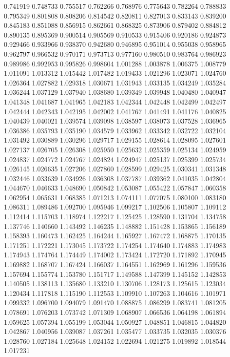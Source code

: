 0.741919
0.748733
0.755517
0.762266
0.768976
0.775643
0.782264
0.788833
0.795349
0.801808
0.808206
0.814542
0.820811
0.827013
0.833143
0.839200
0.845183
0.851088
0.856915
0.862661
0.868325
0.873906
0.879402
0.884812
0.890135
0.895369
0.900514
0.905569
0.910533
0.915406
0.920186
0.924873
0.929466
0.933966
0.938370
0.942680
0.946895
0.951014
0.955038
0.958965
0.962797
0.966532
0.970171
0.973713
0.977160
0.980510
0.983764
0.986923
0.989986
0.992953
0.995826
0.998604
1.001288
1.003878
1.006375
1.008779
1.011091
1.013312
1.015442
1.017482
1.019433
1.021296
1.023071
1.024760
1.026364
1.027882
1.029318
1.030671
1.031943
1.033135
1.034249
1.035284
1.036244
1.037129
1.037940
1.038680
1.039349
1.039948
1.040480
1.040947
1.041348
1.041687
1.041965
1.042183
1.042344
1.042448
1.042499
1.042497
1.042444
1.042343
1.042195
1.042002
1.041767
1.041491
1.041176
1.040825
1.040439
1.040021
1.039574
1.039098
1.038597
1.038073
1.037528
1.036965
1.036386
1.035793
1.035190
1.034579
1.033962
1.033342
1.032722
1.032104
1.031492
1.030889
1.030296
1.029717
1.029155
1.028614
1.028095
1.027601
1.027137
1.026705
1.026308
1.025950
1.025632
1.025359
1.025134
1.024959
1.024837
1.024772
1.024767
1.024824
1.024947
1.025137
1.025399
1.025734
1.026145
1.026635
1.027206
1.027860
1.028599
1.029425
1.030341
1.031348
1.032446
1.033639
1.034926
1.036308
1.037787
1.039362
1.041035
1.042804
1.044670
1.046633
1.048690
1.050842
1.053087
1.055422
1.057847
1.060358
1.062954
1.065631
1.068385
1.071213
1.074111
1.077075
1.080100
1.083180
1.086311
1.089486
1.092700
1.095946
1.099217
1.102506
1.105807
1.109112
1.112414
1.115703
1.118974
1.122217
1.125425
1.128590
1.131704
1.134758
1.137746
1.140660
1.143492
1.146235
1.148882
1.151428
1.153865
1.156189
1.158393
1.160473
1.162425
1.164244
1.165927
1.167472
1.168875
1.170135
1.171251
1.172221
1.173045
1.173722
1.174254
1.174640
1.174883
1.174983
1.174943
1.174764
1.174449
1.174002
1.173424
1.172720
1.171892
1.170945
1.169882
1.168707
1.167424
1.166037
1.164551
1.162969
1.161296
1.159536
1.157694
1.155774
1.153780
1.151717
1.149588
1.147399
1.145152
1.142853
1.140505
1.138113
1.135680
1.133210
1.130706
1.128173
1.125615
1.123034
1.120434
1.117818
1.115190
1.112553
1.109910
1.107263
1.104616
1.101971
1.099332
1.096700
1.094079
1.091470
1.088875
1.086299
1.083741
1.081205
1.078691
1.076203
1.073742
1.071309
1.068907
1.066536
1.064198
1.061894
1.059625
1.057394
1.055199
1.053044
1.050927
1.048851
1.046815
1.044820
1.042867
1.040956
1.039087
1.037261
1.035477
1.033735
1.032035
1.030376
1.028760
1.027184
1.025648
1.024152
1.022694
1.021275
1.019892
1.018544
1.017231
